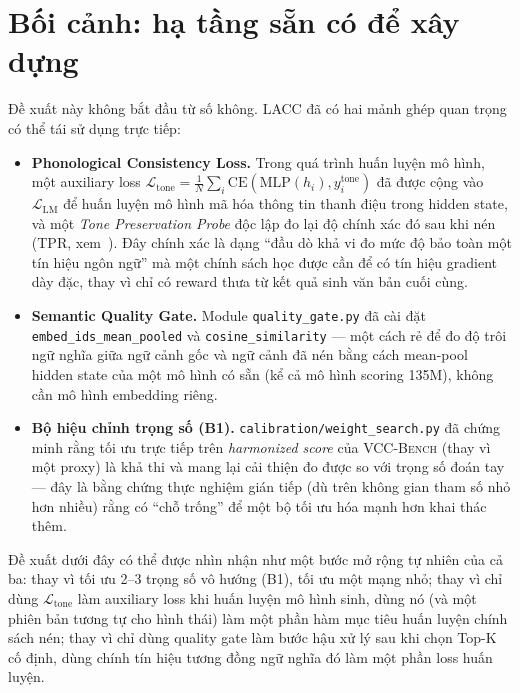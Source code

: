 \documentclass[12pt,a4paper]{article}
\newcommand{\method}[1]{\textsc{#1}}         %
\begin{document}
\section{Bối cảnh: hạ tầng sẵn có để xây dựng}

Đề xuất này không bắt đầu từ số không. \method{LACC} đã có hai mảnh ghép quan trọng có thể tái sử dụng trực tiếp:

\begin{itemize}
    \item \textbf{Phonological Consistency Loss.} Trong quá trình huấn luyện mô hình, một auxiliary loss $\mathcal{L}_{\text{tone}} = \frac{1}{N}\sum_i \text{CE}(\text{MLP}(h_i), y_i^{\text{tone}})$ đã được cộng vào $\mathcal{L}_{\text{LM}}$ để huấn luyện mô hình mã hóa thông tin thanh điệu trong hidden state, và một \textit{Tone Preservation Probe} độc lập đo lại độ chính xác đó sau khi nén (TPR, xem~\cite{lacc2026}). Đây chính xác là dạng ``đầu dò khả vi đo mức độ bảo toàn một tín hiệu ngôn ngữ'' mà một chính sách học được cần để có tín hiệu gradient dày đặc, thay vì chỉ có reward thưa từ kết quả sinh văn bản cuối cùng.
    \item \textbf{Semantic Quality Gate.} Module \texttt{quality\_gate.py} đã cài đặt \texttt{embed\_ids\_mean\_pooled} và \texttt{cosine\_similarity} --- một cách rẻ để đo độ trôi ngữ nghĩa giữa ngữ cảnh gốc và ngữ cảnh đã nén bằng cách mean-pool hidden state của một mô hình có sẵn (kể cả mô hình scoring 135M), không cần mô hình embedding riêng.
    \item \textbf{Bộ hiệu chỉnh trọng số (B1).} \texttt{calibration/weight\_search.py} đã chứng minh rằng tối ưu trực tiếp trên \textit{harmonized score} của \method{VCC-Bench} (thay vì một proxy) là khả thi và mang lại cải thiện đo được so với trọng số đoán tay --- đây là bằng chứng thực nghiệm gián tiếp (dù trên không gian tham số nhỏ hơn nhiều) rằng có ``chỗ trống'' để một bộ tối ưu hóa mạnh hơn khai thác thêm.
\end{itemize}

Đề xuất dưới đây có thể được nhìn nhận như một bước mở rộng tự nhiên của cả ba: thay vì tối ưu 2--3 trọng số vô hướng (B1), tối ưu một mạng nhỏ; thay vì chỉ dùng $\mathcal{L}_{\text{tone}}$ làm auxiliary loss khi huấn luyện mô hình sinh, dùng nó (và một phiên bản tương tự cho hình thái) làm một phần hàm mục tiêu huấn luyện chính sách nén; thay vì chỉ dùng quality gate làm bước hậu xử lý sau khi chọn Top-K cố định, dùng chính tín hiệu tương đồng ngữ nghĩa đó làm một phần loss huấn luyện.
\end{document}
